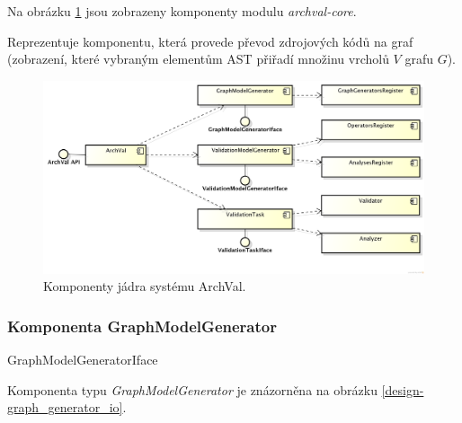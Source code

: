 
Na obrázku \ref{design-archval_core} jsou zobrazeny komponenty modulu \emph{archval-core}.

Reprezentuje komponentu, která provede převod zdrojových kódů na graf (zobrazení, které vybraným elementům AST přiřadí množinu vrcholů $V$ grafu $G$).

\begin{figure}[h!]
  \centering
  \includegraphics[width=1.0\textwidth]{./uml/archval_core_cmp.png}
  \caption{Komponenty jádra systému ArchVal.\label{design-archval_core}}
\end{figure}

\subsubsection{Komponenta GraphModelGenerator}
GraphModelGeneratorIface

Komponenta typu \emph{GraphModelGenerator} je znázorněna na obrázku \ref{design-graph_generator_io}.


